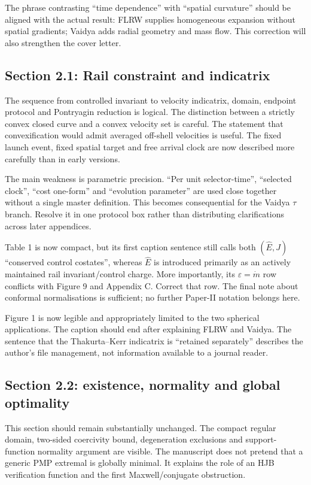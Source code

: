 \documentclass[11pt,a4paper]{article}
\newcommand{\Ehat}{\hat E}
\begin{document}
The phrase contrasting ``time dependence'' with ``spatial curvature'' should be aligned with
the actual result: FLRW supplies homogeneous expansion without spatial gradients; Vaidya adds
radial geometry and mass flow. This correction will also strengthen the cover letter.

\subsection{Section 2.1: Rail constraint and indicatrix}

The sequence from controlled invariant to velocity indicatrix, domain, endpoint protocol and
Pontryagin reduction is logical. The distinction between a strictly convex closed curve and a
convex velocity set is careful. The statement that convexification would admit averaged
off-shell velocities is useful. The fixed launch event, fixed spatial target and free arrival
clock are now described more carefully than in early versions.

The main weakness is parametric precision. ``Per unit selector-time'', ``selected clock'',
``cost one-form'' and ``evolution parameter'' are used close together without a single master
definition. This becomes consequential for the Vaidya $\tau$ branch. Resolve it in one protocol
box rather than distributing clarifications across later appendices.

Table 1 is now compact, but its first caption sentence still calls both $(\Ehat,J)$ ``conserved
control costates'', whereas $\Ehat$ is introduced primarily as an actively maintained rail
invariant/control charge. More importantly, its $\varepsilon=\dot m$ row conflicts with Figure 9
and Appendix C. Correct that row. The final note about conformal normalisations is sufficient;
no further Paper-II notation belongs here.

Figure 1 is now legible and appropriately limited to the two spherical applications. The
caption should end after explaining FLRW and Vaidya. The sentence that the Thakurta--Kerr
indicatrix is ``retained separately'' describes the author's file management, not information
available to a journal reader.

\subsection{Section 2.2: existence, normality and global optimality}

This section should remain substantially unchanged. The compact regular domain, two-sided
coercivity bound, degeneration exclusions and support-function normality argument are visible.
The manuscript does not pretend that a generic PMP extremal is globally minimal. It explains
the role of an HJB verification function and the first Maxwell/conjugate obstruction.
\end{document}
